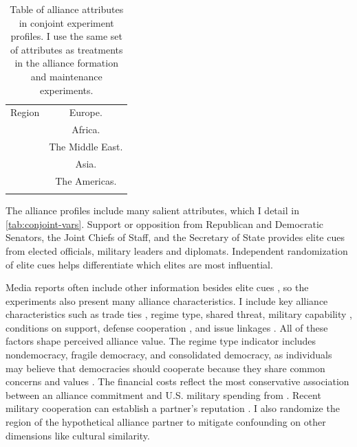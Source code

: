 \documentclass[12pt]{article}
\begin{document}
\begin{table}
\begin{adjustbox}{width = .99\textwidth}
\begin{tabular}{lc}
Region              & Europe. \\ 
                    & Africa. \\
                    & The Middle East. \\ 
                    & Asia. \\   
                    & The Americas. \\ 
                                                                            
\hline \\
\end{tabular}
\end{adjustbox}
\caption{Table of alliance attributes in conjoint experiment profiles. I use the same set of attributes as treatments in the alliance formation and maintenance experiments.} 
\label{tab:conjoint-vars}
\end{table}


The alliance profiles include many salient attributes, which I detail in \autoref{tab:conjoint-vars}. 
Support or opposition from Republican and Democratic Senators, the Joint Chiefs of Staff, and the Secretary of State provides elite cues from elected officials, military leaders and diplomats. 
Independent randomization of elite cues helps differentiate which elites are most influential.


Media reports often include other information besides elite cues \citep{BaumPotter2008}, so the experiments also present many alliance characteristics. 
I include key alliance characteristics such as trade ties \citep{Fordham2010}, regime type, shared threat, military capability \citep{Johnsonetal2015}, conditions on support, defense cooperation \citep{Morrow1994, LeedsAnac2005}, and issue linkages \citep{Poast2012}.
All of these factors shape perceived alliance value. 
The regime type indicator includes nondemocracy, fragile democracy, and consolidated democracy, as individuals may believe that democracies should cooperate because they share common concerns and values \citep{Chuetal2021}. 
The financial costs reflect the most conservative association between an alliance commitment and U.S. military spending from \citet{AlleyFuhrmann2021}. 
Recent military cooperation can establish a partner's reputation \citep{Crescenzietal2012, GannonKent2020}.
I also randomize the region of the hypothetical alliance partner to mitigate confounding on other dimensions like cultural similarity.
\end{document}

